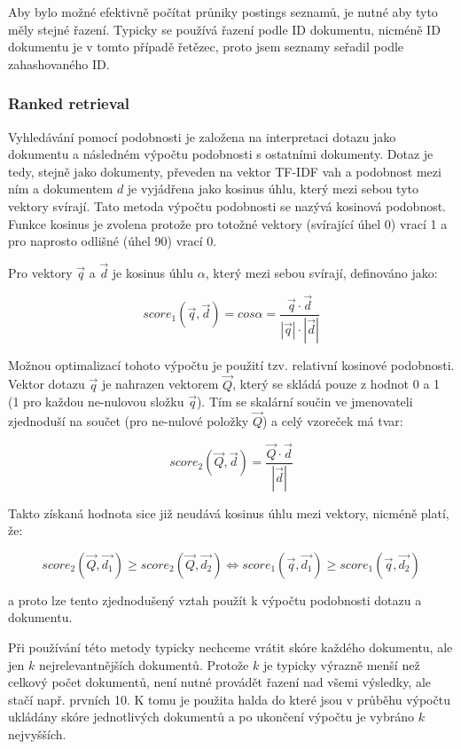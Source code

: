 \documentclass[11pt,a4paper]{scrartcl}
\begin{document}
	Aby bylo možné efektivně počítat průniky postings seznamů, je nutné aby tyto měly stejné řazení. Typicky se používá řazení podle ID dokumentu, nicméně ID dokumentu je v tomto případě řetězec, proto jsem seznamy seřadil podle zahashovaného ID.
	
	\subsubsection{Ranked retrieval}
	Vyhledávání pomocí podobnosti je založena na interpretaci dotazu jako dokumentu a následném výpočtu podobnosti s ostatními dokumenty. Dotaz je tedy, stejně jako dokumenty, převeden na vektor TF-IDF vah a podobnost mezi ním a dokumentem $d$ je vyjádřena jako kosinus úhlu, který mezi sebou tyto vektory svírají. Tato metoda výpočtu podobnosti se nazývá kosinová podobnost. Funkce kosinus je zvolena protože pro totožné vektory (svírající úhel 0\degree) vrací 1 a pro naprosto odlišné (úhel 90\degree) vrací 0.
	
	Pro vektory $\vec{q}$ a $\vec{d}$ je kosinus úhlu $\alpha$, který mezi sebou svírají, definováno jako:
	
	\begin{equation}
		score_1(\vec{q}, \vec{d}) = cos \alpha = \frac{\vec{q} \cdot \vec{d}}{|\vec{q}| \cdot |\vec{d}|}
	\end{equation}
	
	Možnou optimalizací tohoto výpočtu je použití tzv. relativní kosinové podobnosti. Vektor dotazu $\vec{q}$ je nahrazen vektorem $\vec{Q}$, který se skládá pouze z hodnot 0 a 1 (1 pro každou ne-nulovou složku $\vec{q}$). Tím se skalární součin ve jmenovateli zjednoduší na součet (pro ne-nulové položky $\vec{Q}$) a celý vzoreček má tvar:
	
	\begin{equation}
		score_2(\vec{Q},\vec{d}) = \frac{\vec{Q} \cdot \vec{d}}{|\vec{d}|}
	\end{equation}
	
	Takto získaná hodnota sice již neudává kosinus úhlu mezi vektory, nicméně platí, že:
	
	\begin{equation}
		score_2(\vec{Q}, \vec{d_1}) \ge score_2(\vec{Q}, \vec{d_2}) \Leftrightarrow score_1(\vec{q}, \vec{d_1}) \ge score_1(\vec{q}, \vec{d_2})
	\end{equation}
	
	a proto lze tento zjednodušený vztah použít k výpočtu podobnosti dotazu a dokumentu.
	
	Při používání této metody typicky nechceme vrátit skóre každého dokumentu, ale jen $k$ nejrelevantnějších dokumentů. Protože $k$ je typicky výrazně menší než celkový počet dokumentů, není nutné provádět řazení nad všemi výsledky, ale stačí např. prvních 10. K tomu je použita halda do které jsou v průběhu výpočtu ukládány skóre jednotlivých dokumentů a po ukončení výpočtu je vybráno $k$ nejvyšších.
	
\end{document}

